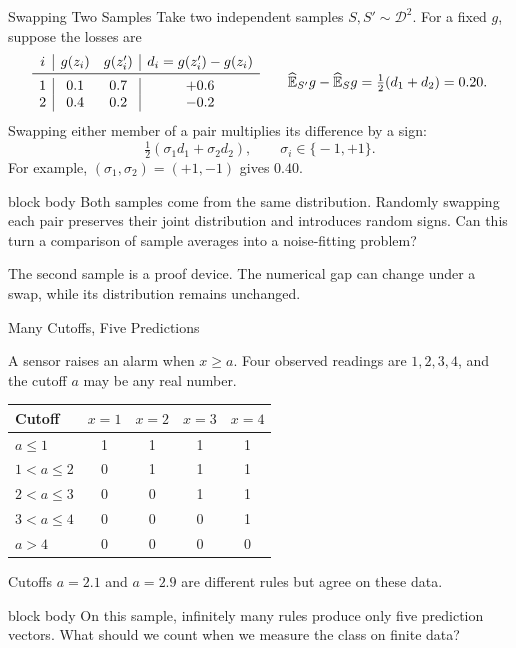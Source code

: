 \documentclass[aspectratio=169,10pt]{beamer}
\newcommand{\D}{\mathcal{D}}
\newcommand{\E}{\mathbb{E}}
\newcommand{\KeyBox}[1]{%
  \begin{beamercolorbox}[rounded=true,sep=0.22cm,wd=\linewidth]{block body}
    #1
  \end{beamercolorbox}%
}
\begin{document}
\begin{frame}[t]{Swapping Two Samples}
  \vspace{0.02cm}
  \small
  Take two independent samples $S,S'\sim\D^2$. For a fixed $g$, suppose
  the losses are
  \[
    \begin{array}{c|cc|c}
      i & g(z_i) & g(z_i') & d_i=g(z_i')-g(z_i)\\
      \midrule
      1 & 0.1 & 0.7 & +0.6\\
      2 & 0.4 & 0.2 & -0.2
    \end{array}
    \qquad
    \widehat{\E}_{S'}g-\widehat{\E}_{S}g
      =\tfrac12(d_1+d_2)=0.20.
  \]
  Swapping either member of a pair multiplies its difference by a sign:
  \[
    \tfrac12(\sigma_1d_1+\sigma_2d_2),\qquad
    \sigma_i\in\{\!-1,+1\!\}.
  \]
  For example, $(\sigma_1,\sigma_2)=(+1,-1)$ gives $0.40$.
  \vspace{0.01cm}
  \KeyBox{\centering
    Both samples come from the same distribution. Randomly swapping each pair
    preserves their joint distribution and introduces random signs.
    Can this turn a comparison of sample averages into a noise-fitting problem?
  }
  \vspace{0.04cm}
  {\scriptsize The second sample is a proof device. The numerical gap can change
  under a swap, while its distribution remains unchanged.}
\end{frame}

\begin{frame}[t]{Many Cutoffs, Five Predictions}
  \vspace{0.04cm}
  \small

  A sensor raises an alarm when $x\ge a$. Four observed readings are
  $1,2,3,4$, and the cutoff $a$ may be any real number.
  \begin{center}
  \renewcommand{\arraystretch}{1.15}
  \begin{tabular}{lcccc}
    \toprule
    Cutoff & $x=1$ & $x=2$ & $x=3$ & $x=4$\\
    \midrule
    $a\le1$ & 1 & 1 & 1 & 1\\
    $1<a\le2$ & 0 & 1 & 1 & 1\\
    $2<a\le3$ & 0 & 0 & 1 & 1\\
    $3<a\le4$ & 0 & 0 & 0 & 1\\
    $a>4$ & 0 & 0 & 0 & 0\\
    \bottomrule
  \end{tabular}
  \end{center}
  Cutoffs $a=2.1$ and $a=2.9$ are different rules but agree on these data.
  \vspace{0.15cm}
  \KeyBox{On this sample, infinitely many rules produce only five prediction
  vectors. What should we count when we measure the class on finite data?}

\end{frame}
\end{document}
